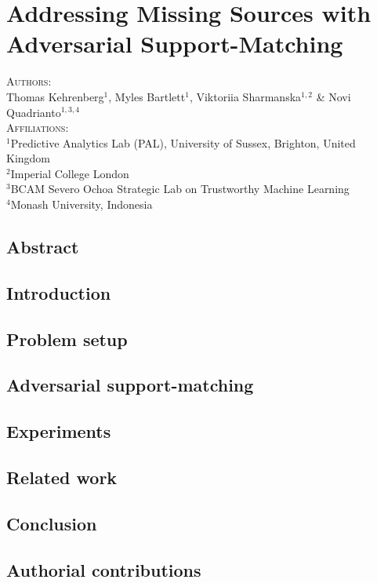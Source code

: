 \chapter{Addressing Missing Sources with Adversarial Support-Matching}\label{ch:supmatch}
\textsc{Authors}:\\
%
Thomas Kehrenberg$^1$, 
Myles Bartlett$^1$,
Viktoriia Sharmanska$^{1, 2}$ \& 
Novi Quadrianto$^{1,3,4}$ \\
%
\textsc{Affiliations}:\\
$^1$Predictive Analytics Lab (PAL), University of Sussex, Brighton, United Kingdom \\
$^2$Imperial College London \\ 
$^3$BCAM Severo Ochoa Strategic Lab on Trustworthy Machine Learning \\
$^4$Monash University, Indonesia \\
%

\section*{Abstract}

\label{sec:sm-abstract}

\section{Introduction}
\label{sec:sm-intro}


\section{Problem setup}
\label{sec:sm-problem-setup}


\section{Adversarial support-matching}
\label{sec:sm-adversarialsm}


\section{Experiments}
\label{sec:sm-exps}


\section{Related work}
\label{sec:sm-related-work}


\section{Conclusion}
\label{sec:sm-conclusion}


% 

\newpage


\clearpage
\section{Authorial contributions}


